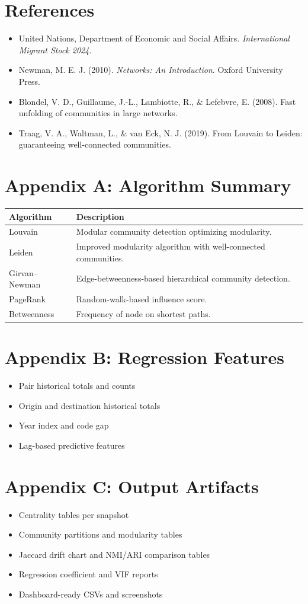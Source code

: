 \documentclass[12pt]{report}
\begin{document}
\chapter{References}
\begin{itemize}
    \item United Nations, Department of Economic and Social Affairs. \textit{International Migrant Stock 2024}.
    \item Newman, M. E. J. (2010). \textit{Networks: An Introduction}. Oxford University Press.
    \item Blondel, V. D., Guillaume, J.-L., Lambiotte, R., \& Lefebvre, E. (2008). Fast unfolding of communities in large networks.
    \item Traag, V. A., Waltman, L., \& van Eck, N. J. (2019). From Louvain to Leiden: guaranteeing well-connected communities.
\end{itemize}

\appendix
\chapter{Appendix A: Algorithm Summary}
\begin{longtable}{p{4cm}p{10cm}}
\toprule
Algorithm & Description \\
\midrule
Louvain & Modular community detection optimizing modularity. \\
Leiden & Improved modularity algorithm with well-connected communities. \\
Girvan--Newman & Edge-betweenness-based hierarchical community detection. \\
PageRank & Random-walk-based influence score. \\
Betweenness & Frequency of node on shortest paths. \\
\bottomrule
\end{longtable}

\chapter{Appendix B: Regression Features}
\begin{itemize}
    \item Pair historical totals and counts
    \item Origin and destination historical totals
    \item Year index and code gap
    \item Lag-based predictive features
\end{itemize}

\chapter{Appendix C: Output Artifacts}
\begin{itemize}
    \item Centrality tables per snapshot
    \item Community partitions and modularity tables
    \item Jaccard drift chart and NMI/ARI comparison tables
    \item Regression coefficient and VIF reports
    \item Dashboard-ready CSVs and screenshots
\end{itemize}
\end{document}
